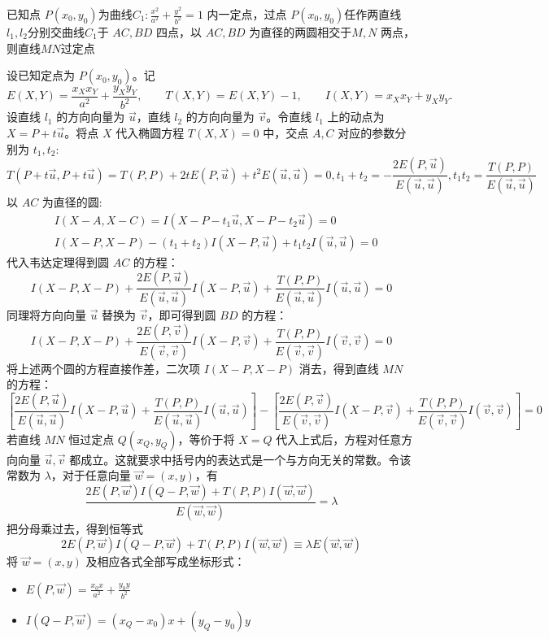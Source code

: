 \begin{exercise}
    已知点 $P(x_0,y_0)$为曲线$C_1:\frac{x^2}{a^2}+\frac{y^2}{b^2}=1$ 内一定点，过点 $P(x_0,y_0)$任作两直线$l_1,l_2$分别交曲线$C_1$于 $AC,BD$ 四点，以 $AC,BD$ 为直径的两圆相交于$M,N$ 两点，则直线$MN$过定点
\end{exercise}
\begin{solution}
设已知定点为 $P(x_0,y_0)$。记
\[
E(X,Y) = \frac{x_X x_Y}{a^2} + \frac{y_X y_Y}{b^2},\qquad T(X,Y) = E(X,Y) - 1,\qquad I(X,Y) = x_X x_Y + y_X y_Y.
\]
设直线 $l_1$ 的方向向量为 $\vec{u}$，直线 $l_2$ 的方向向量为 $\vec{v}$。令直线 $l_1$ 上的动点为 $X = P + t\vec{u}$。将点 $X$ 代入椭圆方程 $T(X,X)=0$ 中，交点 $A, C$ 对应的参数分别为 $t_1, t_2$:
$$T(P+t\vec{u}, P+t\vec{u}) = T(P,P) + 2t E(P,\vec{u}) + t^2 E(\vec{u},\vec{u}) = 0,t_1 + t_2 = -\frac{2E(P,\vec{u})}{E(\vec{u},\vec{u})}, t_1 t_2 = \frac{T(P,P)}{E(\vec{u},\vec{u})}$$
以 $AC$ 为直径的圆:
\begin{align*}
&I(X-A, X-C) =I(X-P-t_1\vec{u}, X-P-t_2\vec{u}) = 0\\
&I(X-P, X-P) - (t_1+t_2)I(X-P, \vec{u}) + t_1 t_2 I(\vec{u},\vec{u}) = 0
\end{align*}
代入韦达定理得到圆 $AC$ 的方程：
$$I(X-P, X-P) + \frac{2E(P,\vec{u})}{E(\vec{u},\vec{u})} I(X-P, \vec{u}) + \frac{T(P,P)}{E(\vec{u},\vec{u})} I(\vec{u},\vec{u}) = 0$$
同理将方向向量 $\vec{u}$ 替换为 $\vec{v}$，即可得到圆 $BD$ 的方程：$$I(X-P, X-P) + \frac{2E(P,\vec{v})}{E(\vec{v},\vec{v})} I(X-P, \vec{v}) + \frac{T(P,P)}{E(\vec{v},\vec{v})} I(\vec{v},\vec{v}) = 0$$
将上述两个圆的方程直接作差，二次项 $I(X-P, X-P)$ 消去，得到直线 $MN$ 的方程：
$$\left[ \frac{2E(P,\vec{u})}{E(\vec{u},\vec{u})} I(X-P, \vec{u}) + \frac{T(P,P)}{E(\vec{u},\vec{u})} I(\vec{u},\vec{u}) \right] - \left[ \frac{2E(P,\vec{v})}{E(\vec{v},\vec{v})} I(X-P, \vec{v}) + \frac{T(P,P)}{E(\vec{v},\vec{v})} I(\vec{v},\vec{v}) \right] = 0$$
若直线 $MN$ 恒过定点 $Q(x_Q, y_Q)$，等价于将 $X=Q$ 代入上式后，方程对任意方向向量 $\vec{u}, \vec{v}$ 都成立。这就要求中括号内的表达式是一个与方向无关的常数。令该常数为 $\lambda$，对于任意向量 $\vec{w}=(x,y)$，有
$$\frac{2E(P,\vec{w}) I(Q-P, \vec{w}) + T(P,P) I(\vec{w},\vec{w})}{E(\vec{w},\vec{w})} = \lambda$$
把分母乘过去，得到恒等式
$$2E(P,\vec{w}) I(Q-P, \vec{w}) + T(P,P) I(\vec{w},\vec{w}) \equiv \lambda E(\vec{w},\vec{w})$$
将 $\vec{w}=(x,y)$ 及相应各式全部写成坐标形式：
\begin{itemize}
\item $E(P,\vec{w}) = \frac{x_0 x}{a^2} + \frac{y_0 y}{b^2}$
\item $I(Q-P, \vec{w}) = (x_Q - x_0)x + (y_Q - y_0)y$

\end{itemize}
\end{solution}
